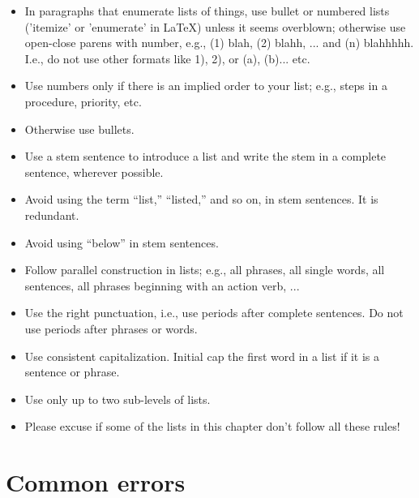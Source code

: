 \begin{itemize}
\item In paragraphs that enumerate lists of things, use bullet or numbered lists ('itemize' or 'enumerate' in LaTeX) unless it seems overblown; otherwise use open-close parens with number, e.g., (1) blah, (2) blahh, ... and (n) blahhhhh. I.e., do not use other formats like 1), 2), or (a), (b)... etc.
\item Use numbers only if there is an implied order to your list; e.g., steps in a procedure, priority, etc.
\item Otherwise use bullets.
\item Use a stem sentence to introduce a list and write the stem in a complete sentence, wherever possible.
\item Avoid using the term ``list,'' ``listed,'' and so on, in stem sentences. It is redundant. 
\item Avoid using ``below'' in stem sentences.
\item Follow parallel construction in lists; e.g., all phrases, all single words, all sentences, all phrases beginning with an action verb, ...
\item Use the right punctuation, i.e., use periods after complete sentences. Do not use periods after phrases or words. 
\item Use consistent capitalization. Initial cap the first word in a list if it is a sentence or phrase. 
\item Use only up to two sub-levels of lists.
\item Please excuse if some of the lists in this chapter don't follow all these rules!
\end{itemize}

\section{Common errors}
\label{sec:errors}

